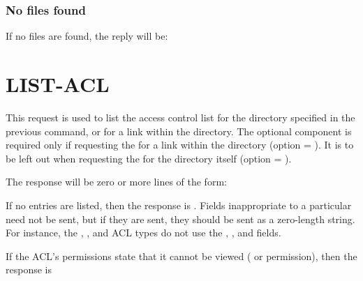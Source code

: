 \subsubsection{No files found}

If no files are found, the reply will be:

\begin{command}
\end{command}

\section{LIST-ACL}

\begin{command}
\commandsize
{}  \zoos{}\zooe\selectlines
\end{command}

This request is used to list the access control list for the directory
specified in the previous  command, or for a link within the
directory.  The optional component is required only if requesting the
 for a link within the directory (option = ).  It is to be left
out when requesting the  for the directory itself
(option = ).	

The response will be zero or more lines of the form:

\begin{command}
    \zoos{} 
	\zoos{} \zoms{}\zome\zooe\zooe
\end{command}

If no  entries are listed, then the response is .
Fields inappropriate to a particular  need not be
sent, but if they are sent, they should be sent as a zero-length
string.  For instance, the , , and
 ACL types do not use the ,
, and  fields.

If the ACL's permissions state that it cannot be viewed ( or
 permission), then the
response is  
\begin{command}
    \zoos{}\zooe
\end{command}

